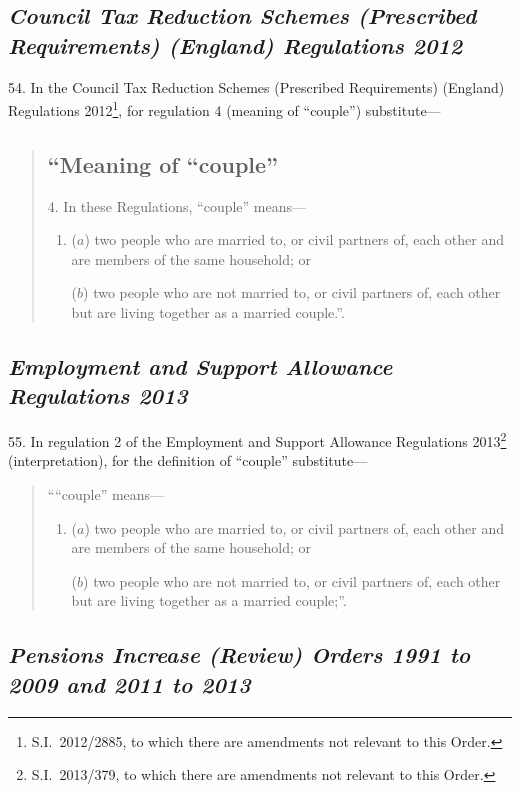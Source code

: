 \documentclass[12pt,a4paper]{article}
\begin{document}
\subsection*{\itshape Council Tax Reduction Schemes (Prescribed Requirements) (England) Regulations 2012}

54.  In the Council Tax Reduction Schemes (Prescribed Requirements) (England) Regulations 2012\footnote{S.I.~2012/2885, to which there are amendments not relevant to this Order.}, for regulation 4 (meaning of “couple”) substitute—
\begin{quotation}
\subsection*{“Meaning of “couple”}

4.  In these Regulations, “couple” means—
\begin{enumerate}\item[]
($a$) two people who are married to, or civil partners of, each other and are members of the same household; or

($b$) two people who are not married to, or civil partners of, each other but are living together as a married couple.”.
\end{enumerate}
\end{quotation}

\subsection*{\itshape Employment and Support Allowance Regulations 2013}

55.  In regulation 2 of the Employment and Support Allowance Regulations 2013\footnote{S.I.~2013/379, to which there are amendments not relevant to this Order.} (interpretation), for the definition of “couple” substitute—
\begin{quotation}
““couple” means—
\begin{enumerate}\item[]
($a$) 
two people who are married to, or civil partners of, each other and are members of the same household; or

($b$) 
two people who are not married to, or civil partners of, each other but are living together as a married couple;”.
\end{enumerate}
\end{quotation}

\subsection*{\itshape Pensions Increase (Review) Orders 1991 to 2009 and 2011 to 2013}
\end{document}
